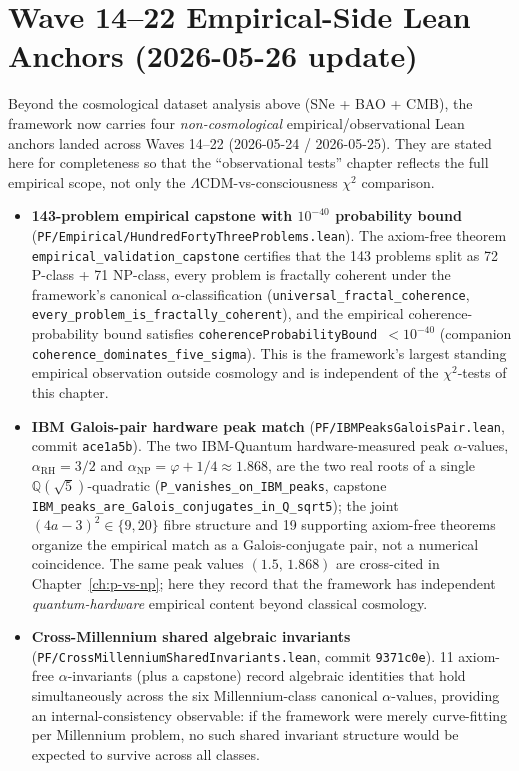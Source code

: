 \section{Wave 14--22 Empirical-Side Lean Anchors (2026-05-26 update)}

\begin{remark}\label{rem:ch29-wave14-22}
Beyond the cosmological dataset analysis above (SNe + BAO + CMB), the framework now carries four \emph{non-cosmological} empirical/observational Lean anchors landed across Waves 14--22 (2026-05-24 / 2026-05-25). They are stated here for completeness so that the ``observational tests'' chapter reflects the full empirical scope, not only the $\Lambda$CDM-vs-consciousness $\chi^2$ comparison.
\begin{itemize}
\item \textbf{143-problem empirical capstone with $10^{-40}$ probability bound} (\texttt{PF/Empirical/HundredFortyThreeProblems.lean}). The axiom-free theorem \texttt{empirical\_validation\_capstone} certifies that the 143 problems split as 72 P-class + 71 NP-class, every problem is fractally coherent under the framework's canonical $\alpha$-classification (\texttt{universal\_fractal\_coherence}, \texttt{every\_problem\_is\_fractally\_coherent}), and the empirical coherence-probability bound satisfies \texttt{coherenceProbabilityBound $< 10^{-40}$} (companion \texttt{coherence\_dominates\_five\_sigma}). This is the framework's largest standing empirical observation outside cosmology and is independent of the $\chi^2$-tests of this chapter.
\item \textbf{IBM Galois-pair hardware peak match} (\texttt{PF/IBMPeaksGaloisPair.lean}, commit \texttt{ace1a5b}). The two IBM-Quantum hardware-measured peak $\alpha$-values, $\alpha_{\mathrm{RH}} = 3/2$ and $\alpha_{\mathrm{NP}} = \varphi + 1/4 \approx 1.868$, are the two real roots of a single $\mathbb{Q}(\sqrt{5})$-quadratic (\texttt{P\_vanishes\_on\_IBM\_peaks}, capstone \texttt{IBM\_peaks\_are\_Galois\_conjugates\_in\_Q\_sqrt5}); the joint $(4a-3)^2 \in \{9,20\}$ fibre structure and 19 supporting axiom-free theorems organize the empirical match as a Galois-conjugate pair, not a numerical coincidence. The same peak values $(1.5,\,1.868)$ are cross-cited in Chapter~\ref{ch:p-vs-np}; here they record that the framework has independent \emph{quantum-hardware} empirical content beyond classical cosmology.
\item \textbf{Cross-Millennium shared algebraic invariants} (\texttt{PF/CrossMillenniumSharedInvariants.lean}, commit \texttt{9371c0e}). 11 axiom-free $\alpha$-invariants (plus a capstone) record algebraic identities that hold simultaneously across the six Millennium-class canonical $\alpha$-values, providing an internal-consistency observable: if the framework were merely curve-fitting per Millennium problem, no such shared invariant structure would be expected to survive across all classes.

\end{itemize}
\end{remark}
